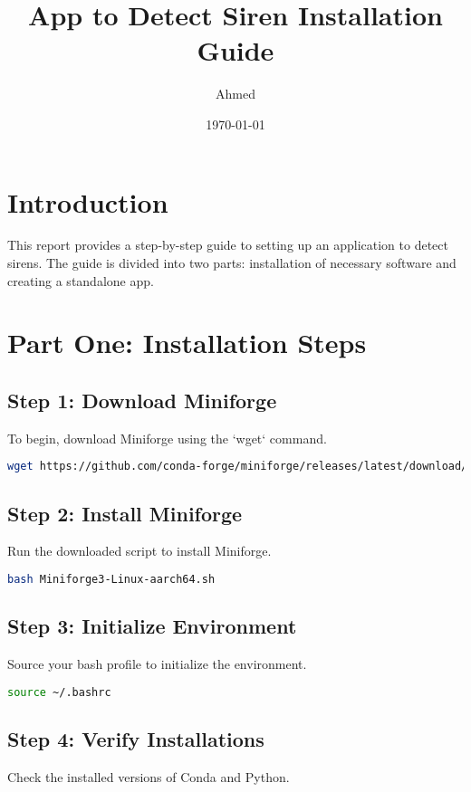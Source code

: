 \documentclass{report}
\title{App to Detect Siren Installation Guide}
\author{Ahmed}
\date{\today}
\begin{document}
\maketitle

\tableofcontents

\chapter{Introduction}
This report provides a step-by-step guide to setting up an application to detect sirens. The guide is divided into two parts: installation of necessary software and creating a standalone app.

\chapter{Part One: Installation Steps}

\section{Step 1: Download Miniforge}
To begin, download Miniforge using the `wget` command.

\begin{lstlisting}[language=bash]
wget https://github.com/conda-forge/miniforge/releases/latest/download/Miniforge3-Linux-aarch64.sh
\end{lstlisting}

\section{Step 2: Install Miniforge}
Run the downloaded script to install Miniforge.

\begin{lstlisting}[language=bash]
bash Miniforge3-Linux-aarch64.sh
\end{lstlisting}

\section{Step 3: Initialize Environment}
Source your bash profile to initialize the environment.

\begin{lstlisting}[language=bash]
source ~/.bashrc
\end{lstlisting}

\section{Step 4: Verify Installations}
Check the installed versions of Conda and Python.
\end{document}
